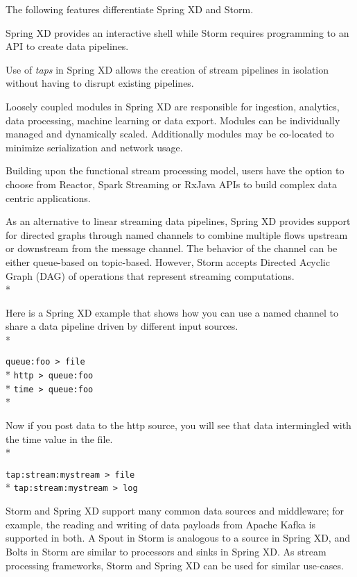 The following features differentiate Spring XD and Storm.

\begin{itemize*}
\item Spring XD provides an interactive shell while Storm requires programming
to an API to create data pipelines.
\item Use of \emph{taps} in Spring XD allows the creation of stream pipelines
in isolation without having to disrupt existing pipelines.
\item Loosely coupled modules in Spring XD are responsible for ingestion, analytics,
data processing, machine learning or data export. Modules can be individually managed
and dynamically scaled. Additionally modules may be co-located to minimize
serialization and network usage.
\item Building upon the functional stream processing model, users have the option
to choose from Reactor\cite{reactor}, Spark Streaming or RxJava APIs to build
complex data centric applications.
\item As an alternative to linear streaming data pipelines, Spring XD provides 
support for directed graphs through named channels to combine multiple flows 
upstream or downstream from the message channel. The behavior of the channel 
can be either queue-based on topic-based. However, Storm accepts Directed 
Acyclic Graph (DAG)\cite{dag} of operations that represent streaming 
computations.\\*

Here is a Spring XD example that shows how you can use a named channel to share 
a data pipeline driven by different input sources.\\*

\verb;queue:foo > file;\\*
\verb;http > queue:foo;\\*
\verb;time > queue:foo;\\*

Now if you post data to the http source, you will see that data intermingled 
with the time value in the file.\\*

\verb;tap:stream:mystream > file;\\*
\verb;tap:stream:mystream > log;

\end{itemize*}

Storm and Spring XD support many common data sources and middleware;
for example, the reading and writing of data payloads from Apache Kafka
is supported in both. A Spout in Storm is analogous to a
source in Spring XD, and Bolts in Storm are similar to processors and sinks
in Spring XD. As stream processing frameworks, Storm and Spring XD can be used for
similar use-cases.

